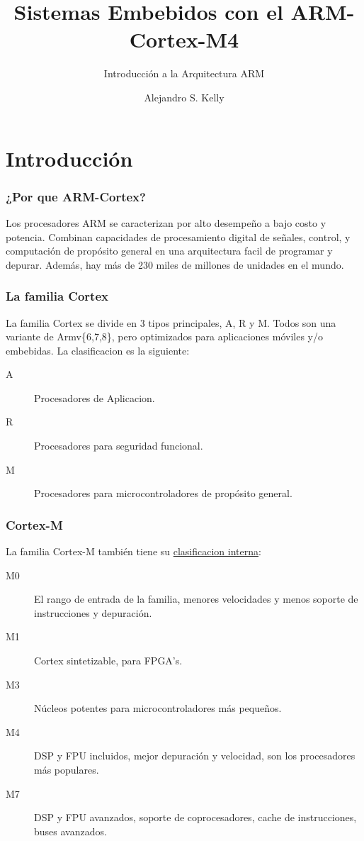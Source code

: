 \documentclass[11pt]{beamer}
\title{Sistemas Embebidos con el ARM-Cortex-M4}
\subtitle{Introducción a la Arquitectura ARM}
\author[AK]{Alejandro S. Kelly}
\institute[]{Pulsar Labs}
\begin{document}
    \frame{\titlepage}

    \section{Introducción}

        \begin{frame}
            \frametitle{¿Por que ARM-Cortex?}

            Los procesadores ARM se caracterizan por alto desempeño a bajo costo y potencia. \hfill\break\break 
            Combinan capacidades de procesamiento digital de señales, control, y computación de propósito general en una arquitectura facil de programar y depurar. \hfill\break\break 
            Además, hay más de 230 miles de millones de unidades en el mundo. 
        \end{frame}

        \begin{frame}
            \frametitle{La familia Cortex}

            La familia Cortex se divide en 3 tipos principales, A, R y M. Todos son una variante de Armv\{6,7,8\}, pero optimizados para aplicaciones móviles y/o embebidas.
            La clasificacion es la siguiente: 
                
            \begin{description}
                \item[A] Procesadores de Aplicacion. 
                \item[R] Procesadores para seguridad funcional.
                \item[M] Procesadores para microcontroladores de propósito general. 
            \end{description}
        \end{frame}

        \begin{frame}
            \frametitle{Cortex-M}

            La familia Cortex-M también tiene su \href{run:./Resources/CORTEX_COMPARISON.pdf}{clasificacion interna}:
            
            \begin{description}
                \item[M0] El rango de entrada de la familia, menores velocidades y menos soporte de instrucciones y depuración. 
                \item[M1] Cortex sintetizable, para FPGA's.
                \item[M3] Núcleos potentes para microcontroladores más pequeños.
                \item[M4] DSP y FPU incluidos, mejor depuración y velocidad, son los procesadores más populares.
                \item[M7] DSP y FPU avanzados, soporte de coprocesadores, cache de instrucciones, buses avanzados.
            \end{description}
        \end{frame}
\end{document}
